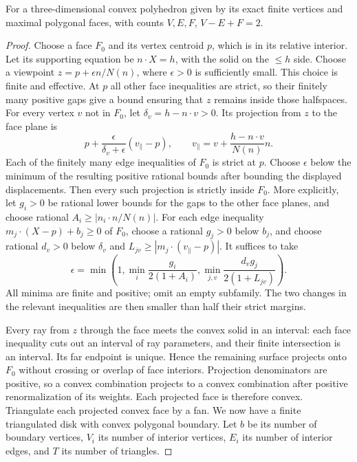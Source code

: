 \begin{theorem}
\label{sol:euler}
For a three-dimensional convex polyhedron given by its exact finite
vertices and maximal polygonal faces, with counts $V,E,F$,
$V-E+F=2$.
\end{theorem}
\begin{proof}
Choose a face $F_0$ and its vertex centroid $p$, which is in its relative
interior. Let its supporting equation be $n\cdot X=h$, with the solid
on the $\le h$ side. Choose a viewpoint
$z=p+\epsilon n/N(n)$, where $\epsilon>0$ is sufficiently small.
This choice is finite and effective. At $p$ all other face inequalities
are strict, so their finitely many positive gaps give a bound ensuring
that $z$ remains inside those halfspaces. For every vertex $v$ not in
$F_0$, let $\delta_v=h-n\cdot v>0$. Its projection from $z$ to
the face plane is
\[
 p+\frac{\epsilon}{\delta_v+\epsilon}(v_{\parallel}-p),
 \qquad
 v_{\parallel}=v+\frac{h-n\cdot v}{N(n)}n.
\]
Each of the finitely many edge inequalities of $F_0$ is strict at $p$.
Choose $\epsilon$ below the minimum of the resulting positive rational
bounds after bounding the displayed displacements. Then every such
projection is strictly inside $F_0$.
More explicitly, let $g_i>0$ be rational lower bounds for the gaps to
the other face planes, and choose rational
$A_i\ge|n_i\cdot n/N(n)|$. For each edge inequality
$m_j\cdot(X-p)+b_j\ge0$ of $F_0$, choose a rational
$g_j>0$ below $b_j$, and choose rational
$d_v>0$ below $\delta_v$ and
$L_{jv}\ge|m_j\cdot(v_{\parallel}-p)|$.
It suffices to take
\[
 \epsilon=\min\left(1,\min_i\frac{g_i}{2(1+A_i)},
                     \min_{j,v}\frac{d_vg_j}{2(1+L_{jv})}\right).
\]
All minima are finite and positive; omit an empty subfamily. The two
changes in the relevant inequalities are then smaller than half their
strict margins.

Every ray from $z$ through the face meets the convex solid in an interval:
each face inequality cuts out an interval of ray parameters, and their
finite intersection is an interval. Its far endpoint is unique. Hence the
remaining surface projects onto $F_0$ without crossing or overlap of
face interiors. Projection denominators are positive, so a convex
combination projects to a convex combination after positive renormalization
of its weights. Each projected face is therefore convex.
Triangulate each projected convex face by a fan. We now
have a finite triangulated disk with convex polygonal boundary. Let $b$
be its number of boundary vertices, $V_i$ its number of interior vertices,
$E_i$ its number of interior edges, and $T$ its number of triangles.


\end{proof}
